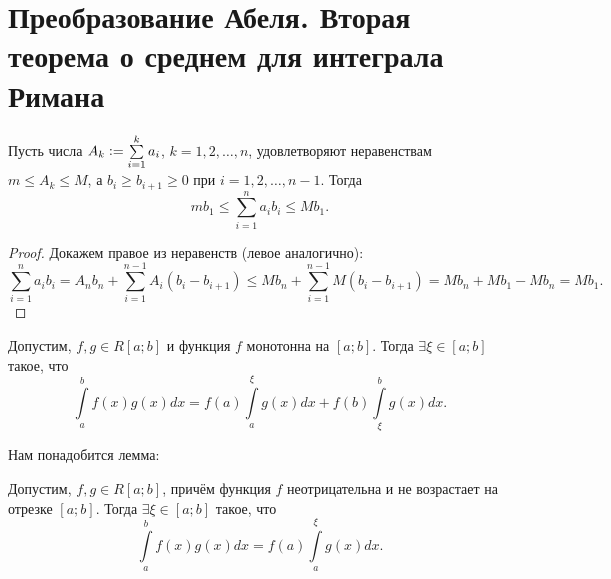 \section{Преобразование Абеля. Вторая теорема о среднем для интеграла Римана}

\begin{lemma}
    Пусть числа $A_k \vcentcolon = \sum\limits_{i = 1}^ka_i$, $k = 1, 2, \ldots, n$, удовлетворяют неравенствам $m \leqslant A_k \leqslant M$, а $b_i \geqslant b_{i + 1} \geqslant 0$ при $i = 1, 2, \ldots, n - 1$. Тогда
    \[
        mb_1 \leqslant \sum_{i = 1}^na_ib_i \leqslant Mb_1.
    \]
\end{lemma}

\begin{proof}
    Докажем правое из неравенств (левое аналогично):
    \[
        \sum_{i = 1}^na_ib_i = A_nb_n + \sum_{i = 1}^{n - 1}A_i(b_i - b_{i + 1}) \leqslant Mb_n + \sum_{i = 1}^{n - 1}M(b_i - b_{i + 1}) = Mb_n + Mb_1 - Mb_n = Mb_1.
    \]
\end{proof}

\begin{theorem}
    Допустим, $f, g \in R[a; b]$ и функция $f$ монотонна на $[a; b]$. Тогда $\exists\xi \in [a; b]$ такое, что
    \[
        \int\limits_a^bf(x)g(x)dx = f(a)\int\limits_a^\xi g(x)dx + f(b)\int\limits_\xi^bg(x)dx.
    \]
\end{theorem}

Нам понадобится лемма:

\begin{lemma}
    Допустим, $f, g \in R[a; b]$, причём функция $f$ неотрицательна и не возрастает на отрезке $[a; b]$. Тогда $\exists\xi \in [a; b]$ такое, что
    \[
        \int\limits_a^bf(x)g(x)dx = f(a)\int\limits_a^\xi g(x)dx.
    \]
\end{lemma}

